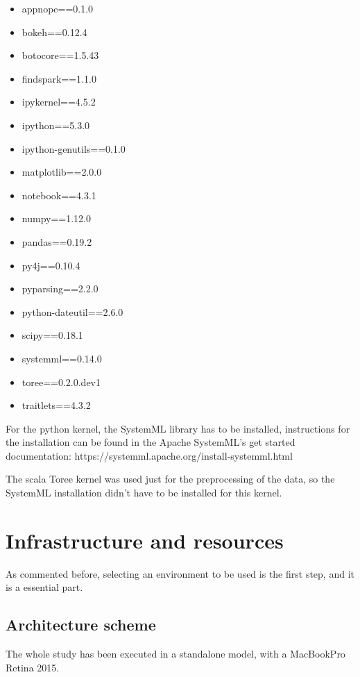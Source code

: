 \documentclass[11pt]{article} %
\begin{document}
    \begin{itemize}
      \item appnope==0.1.0
      \item bokeh==0.12.4
      \item botocore==1.5.43
      \item findspark==1.1.0
      \item ipykernel==4.5.2
      \item ipython==5.3.0
      \item ipython-genutils==0.1.0
      \item matplotlib==2.0.0
      \item notebook==4.3.1
      \item numpy==1.12.0
      \item pandas==0.19.2
      \item py4j==0.10.4
      \item pyparsing==2.2.0
      \item python-dateutil==2.6.0
      \item scipy==0.18.1
      \item systemml==0.14.0
      \item toree==0.2.0.dev1
      \item traitlets==4.3.2
    \end{itemize}

    For the python kernel, the SystemML library has to be installed, instructions for the installation can be found in the Apache SystemML's get started documentation: https://systemml.apache.org/install-systemml.html

    The scala Toree kernel was used just for the preprocessing of the data, so the SystemML installation didn't have to be installed for this kernel.


\section{Infrastructure and resources}
  \label{sec:infrastructure_and_resources}

  As commented before, selecting an environment to be used is the first step, and it is a essential part.

  \subsection{Architecture scheme}

    The whole study has been executed in a standalone model, with a MacBookPro Retina 2015.
\end{document}
